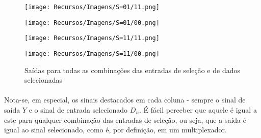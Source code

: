 \documentclass[a4paper,12pt]{article}
\begin{document}
\begin{figure}[H]
    \begin{minipage}[t]{0.2675\textwidth}
        \centering
        \begin{tcolorbox}[colframe=cinza, colback=white, boxrule=0pt, arc=0pt, width=\textwidth, boxsep=0pt, left=0pt, right=0pt, top=0pt, bottom=0pt]
            \texttt{[image: Recursos/Imagens/S=01/11.png]}
        \end{tcolorbox}
    \end{minipage}
    \hspace{0.1em}
    \begin{minipage}[t]{0.2675\textwidth}
        \centering
        \begin{tcolorbox}[colframe=cinza, colback=white, boxrule=0pt, arc=0pt, width=\textwidth, boxsep=0pt, left=0pt, right=0pt, top=0pt, bottom=0pt]
            \texttt{[image: Recursos/Imagens/S=01/00.png]}
        \end{tcolorbox}
    \end{minipage}
    
    \vspace{0.25em}
    
    \begin{minipage}[t]{0.2675\textwidth}
        \centering
        \begin{tcolorbox}[colframe=cinza, colback=white, boxrule=0pt, arc=0pt, width=\textwidth, boxsep=0pt, left=0pt, right=0pt, top=0pt, bottom=0pt]
            \texttt{[image: Recursos/Imagens/S=11/11.png]}
        \end{tcolorbox}
    \end{minipage}
    \hspace{0.1em}
    \begin{minipage}[t]{0.2675\textwidth}
        \centering
        \begin{tcolorbox}[colframe=cinza, colback=white, boxrule=0pt, arc=0pt, width=\textwidth, boxsep=0pt, left=0pt, right=0pt, top=0pt, bottom=0pt]
            \texttt{[image: Recursos/Imagens/S=11/00.png]}
        \end{tcolorbox}
    \end{minipage}
    
    \caption{Saídas para todas as combinações das entradas de seleção e de dados selecionadas}
    \vspace{-20pt}
\end{figure}

\paragraph{}
Nota-se, em especial, os sinais destacados em cada coluna - sempre o sinal de saída $Y$ e o sinal de entrada selecionado $D_{n}$. É fácil perceber que aquele é igual a este para qualquer combinação das entradas de seleção, ou seja, que a saída é igual ao sinal selecionado, como é, por definição, em um multiplexador.
\end{document}
